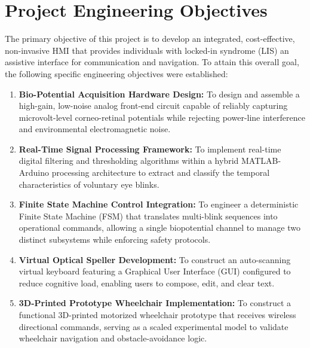 \section{Project Engineering Objectives}
\label{sec:project_engineering_objectives}

The primary objective of this project is to develop an integrated, cost-effective, non-invasive HMI that provides individuals with locked-in syndrome (LIS) an assistive interface for communication and navigation. To attain this overall goal, the following specific engineering objectives were established:

\begin{enumerate}[label=\textbf{\arabic*.}]
    \item \textbf{Bio-Potential Acquisition Hardware Design:} To design and assemble a high-gain, low-noise analog front-end circuit capable of reliably capturing microvolt-level corneo-retinal potentials while rejecting power-line interference and environmental electromagnetic noise.
    \item \textbf{Real-Time Signal Processing Framework:} To implement real-time digital filtering and thresholding algorithms within a hybrid MATLAB-Arduino processing architecture to extract and classify the temporal characteristics of voluntary eye blinks.
    \item \textbf{Finite State Machine Control Integration:} To engineer a deterministic Finite State Machine (FSM) that translates multi-blink sequences into operational commands, allowing a single biopotential channel to manage two distinct subsystems while enforcing safety protocols.
    \item \textbf{Virtual Optical Speller Development:} To construct an auto-scanning virtual keyboard featuring a Graphical User Interface (GUI) configured to reduce cognitive load, enabling users to compose, edit, and clear text.
    \item \textbf{3D-Printed Prototype Wheelchair Implementation:} To construct a functional 3D-printed motorized wheelchair prototype that receives wireless directional commands, serving as a scaled experimental model to validate wheelchair navigation and obstacle-avoidance logic.
\end{enumerate}
